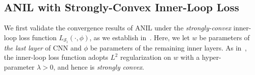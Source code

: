\documentclass{osudissert96}
\begin{document}
\subsection*{ANIL with Strongly-Convex Inner-Loop Loss}

We first validate the convergence results of ANIL under the {\em strongly-convex} inner-loop loss function $L_{\mathcal{S}_i}(\cdot,\phi)$, as we establish in~. 
Here, we let $w$ be parameters of {\em the last layer} of CNN and $\phi$ be parameters of the remaining inner layers. As in~\cite{bertinetto2018meta,lee2019meta}, the inner-loop loss function adopts $L^2$ regularization on $w$ with a hyper-parameter $\lambda>0$, and hence is {\em strongly convex}. 



\end{document}
